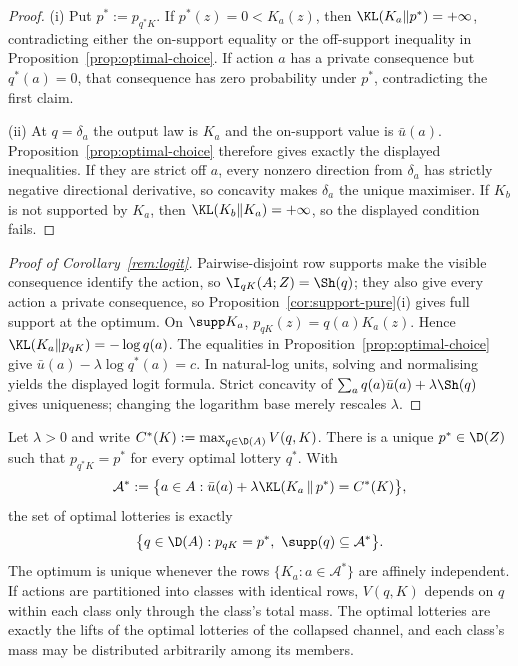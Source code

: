 \begin{proof}
(i) Put $p^*:=p_{q^*K}$.  If $p^*(z)=0<K_a(z)$, then
$\KL(K_a\|p^*)=+\infty$, contradicting either the on-support equality or
the off-support inequality in Proposition~\ref{prop:optimal-choice}.
If action $a$ has a private consequence but $q^*(a)=0$, that consequence
has zero probability under $p^*$, contradicting the first claim.

(ii) At $q=\delta_a$ the output law is $K_a$ and the on-support value is
$\bar u(a)$.  Proposition~\ref{prop:optimal-choice} therefore gives exactly
the displayed inequalities.  If they are strict off $a$, every nonzero
direction from $\delta_a$ has strictly negative directional derivative, so
concavity makes $\delta_a$ the unique maximiser.
If $K_b$ is not supported by $K_a$, then $\KL(K_b\|K_a)=+\infty$, so the
displayed condition fails.
\end{proof}

\begin{proof}[Proof of Corollary~\ref{rem:logit}]
Pairwise-disjoint row supports make the visible consequence identify the
action, so $\I_{qK}(A;Z)=\Sh(q)$; they also give every action a private
consequence, so Proposition~\ref{cor:support-pure}\textup{(i)} gives full
support at the optimum.  On $\supp K_a$,
$p_{qK}(z)=q(a)K_a(z)$.  Hence
$\KL(K_a\|p_{qK})=-\log q(a)$.  The equalities in
Proposition~\ref{prop:optimal-choice} give
$\bar u(a)-\lambda\log q^*(a)=c$.  In natural-log units, solving and
normalising yields the displayed logit formula.  Strict concavity of
$\sum_aq(a)\bar u(a)+\lambda\Sh(q)$ gives uniqueness; changing the
logarithm base merely rescales $\lambda$.
\end{proof}

\begin{proposition}\label{prop:optimal-marginal}
Let $\lambda>0$ and write $C^*(K):=\max_{q\in\D(A)}V(q,K)$.  There is a unique $p^*\in\D(Z)$ such that
$p_{q^*K}=p^*$ for every optimal lottery $q^*$.  With
\[
 \mathcal A^*
 :=\bigl\{a\in A:
 \bar u(a)+\lambda
 \KL\!\left(K_a\,\middle\|\,p^*\right)=C^*(K)
 \bigr\},
\]
the set of optimal lotteries is exactly
\[
 \bigl\{q\in\D(A):
 p_{qK}=p^*,\ \supp(q)\subseteq\mathcal A^*
 \bigr\}.
\]
The optimum is unique whenever the rows $\{K_a:a\in\mathcal A^*\}$ are affinely independent.  If actions are
partitioned into classes with identical rows, $V(q,K)$ depends on $q$ within each class only through the class's
total mass.  The optimal lotteries are exactly the lifts of the optimal lotteries of the collapsed channel, and
each class's mass may be distributed arbitrarily among its members.
\end{proposition}

